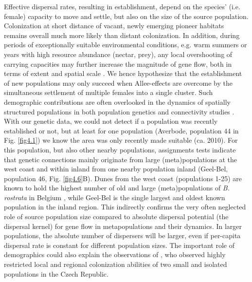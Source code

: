 \documentclass[10pt, twoside]{book} %
\begin{document}
	Effective dispersal rates, resulting in establishment, depend on the species' (i.e. female) capacity to move and settle, but also on the size of the source population. Colonization at short distance of vacant, newly emerging pioneer habitats remains overall much more likely than distant colonization. In addition, during periods of exceptionally suitable environmental conditions, e.g. warm summers or years with high resource abundance (nectar, prey), any local overshooting of carrying capacities may further increase the magnitude of gene flow, both in terms of extent \citep[the threshold in density dependent dispersal;][]{kun2006, best2007} and spatial scale \citep[the fatness of the dispersal kernel][]{bitume2013}. We hence hypothesize that the establishment of new populations may only succeed when Allee-effects are overcome by the simultaneous settlement of multiple females into a single cluster. Such demographic contributions are often overlooked in the dynamics of spatially structured populations in both population genetics and connectivity studies \citep{lowe2017, drake2022}. With our genetic data, we could not detect if a population was recently established or not, but at least for one population (Averbode, population 44 in Fig. \ref{fig4.1}) we know the area was only recently made suitable (ca. 2010). For this population, but also other nearby populations, assignments tests indicate that genetic connections mainly originate from large (meta)populations at the west coast and within inland from one nearby population inland (Geel-Bel, population 46, Fig. \ref{fig4.6}B). Dunes from the west coast (populations 1-25) are known to hold the highest number of old and large (meta)populations of \textit{B. rostrata} in Belgium \citep[unpubl. monitoring data;][confirmed by citizen science data from observation.org, and confirmed to a certain degree by F\textsubscript{IS} results, supplementary material S7]{klein2004}, while Geel-Bel is the single largest and oldest known population in the inland region. This indirectly confirms the very often neglected role of source population size compared to absolute dispersal potential (the dispersal kernel) for gene flow in metapopulations and their dynamics. In larger populations, the absolute number of dispersers will be larger, even if per-capita dispersal rate is constant for different population sizes. The important role of demographics could also explain the observations of \citet{bogusch2021}, who observed highly restricted local and regional colonization abilities of two small and isolated populations in the Czech Republic.\\
	
\end{document}

